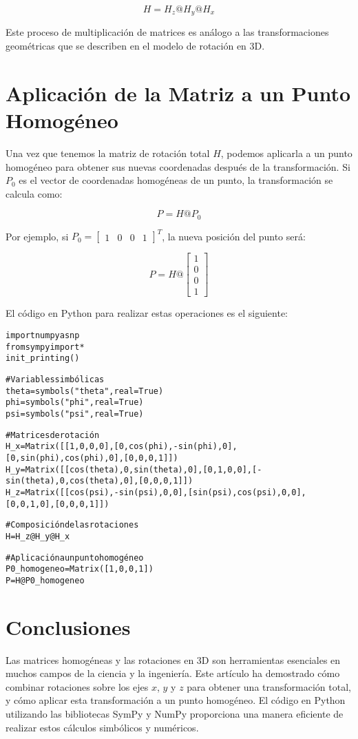 \documentclass[a4paper, 10pt]{article}
\begin{document}
\[
H = H_z @ H_y @ H_x
\]

Este proceso de multiplicación de matrices es análogo a las transformaciones geométricas que se describen en el modelo de rotación en 3D.

\section{Aplicación de la Matriz a un Punto Homogéneo}
Una vez que tenemos la matriz de rotación total \(H\), podemos aplicarla a un punto homogéneo para obtener sus nuevas coordenadas después de la transformación. Si \(P_0\) es el vector de coordenadas homogéneas de un punto, la transformación se calcula como:

\[
P = H @ P_0
\]

Por ejemplo, si \( P_0 = \begin{bmatrix} 1 & 0 & 0 & 1 \end{bmatrix}^T \), la nueva posición del punto será:

\[
P = H @ \begin{bmatrix} 1 \\ 0 \\ 0 \\ 1 \end{bmatrix}
\]

El código en Python para realizar estas operaciones es el siguiente:

\begin{alltt}
import numpy as np
from sympy import *
init_printing()

# Variables simbólicas
theta = symbols("theta", real=True)
phi = symbols("phi", real=True)
psi = symbols("psi", real=True)

# Matrices de rotación
H_x = Matrix([[1, 0, 0, 0], [0, cos(phi), -sin(phi), 0], [0, sin(phi), cos(phi), 0], [0, 0, 0, 1]])
H_y = Matrix([[cos(theta), 0, sin(theta), 0], [0, 1, 0, 0], [-sin(theta), 0, cos(theta), 0], [0, 0, 0, 1]])
H_z = Matrix([[cos(psi), -sin(psi), 0, 0], [sin(psi), cos(psi), 0, 0], [0, 0, 1, 0], [0, 0, 0, 1]])

# Composición de las rotaciones
H = H_z @ H_y @ H_x

# Aplicación a un punto homogéneo
P0_homogeneo = Matrix([1, 0, 0, 1])
P = H @ P0_homogeneo
\end{alltt}

\section{Conclusiones}
Las matrices homogéneas y las rotaciones en 3D son herramientas esenciales en muchos campos de la ciencia y la ingeniería. Este artículo ha demostrado cómo combinar rotaciones sobre los ejes \(x\), \(y\) y \(z\) para obtener una transformación total, y cómo aplicar esta transformación a un punto homogéneo. El código en Python utilizando las bibliotecas SymPy y NumPy proporciona una manera eficiente de realizar estos cálculos simbólicos y numéricos.
\end{document}
